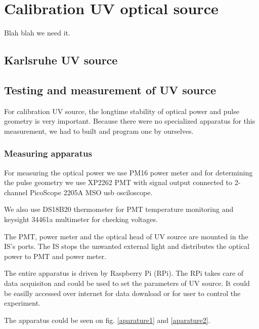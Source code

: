 
\chapter{Calibration UV optical source}
Blah blah we need it.
\section{Karlsruhe UV source}


\section{Testing and measurement of UV source}
For calibration UV source, the longtime stability of optical power and pulse geometry is very important. Because there were no specialized apparatus for this measurement, we had to built and program one by ourselves.
\subsection{Measuring apparatus}
For measuring the optical power we use PM16 power meter and for determining the pulse geometry we use XP2262 PMT with signal output connected to 2-channel PicoScope 2205A MSO usb osciloscope.
\par
We also use DS18B20 thermometer for PMT temperature monitoring and keysight 34461a multimeter for checking voltages.

\par
The PMT, power meter and the optical head of UV source are mounted in the IS's ports. The IS stops the unwanted external light and distributes the optical power to PMT and power meter. 
\par
The entire apparatus is driven by Raspberry Pi (RPi). The RPi takes care of data acquisiton and could be used to set the parameters of UV source. It could be easilly accessed over internet for data download or for user to control the experiment.
\par


\par
The apparatus could be seen on fig. \ref{aparature1} and \ref{aparature2}.

